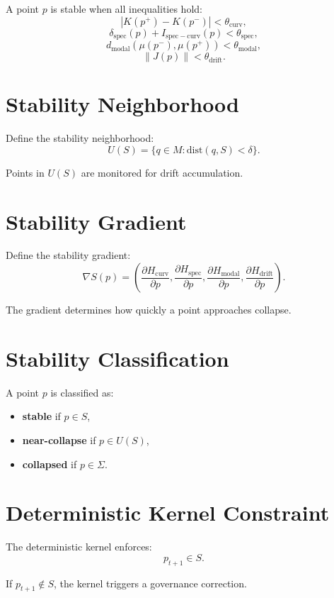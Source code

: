 \documentclass[11pt]{article}
\begin{document}
A point $p$ is stable when all inequalities hold:
\[
|K(p^+) - K(p^-)| < \theta_{\mathrm{curv}},
\]
\[
\delta_{\mathrm{spec}}(p)
  + I_{\mathrm{spec-curv}}(p)
  < \theta_{\mathrm{spec}},
\]
\[
d_{\mathrm{modal}}(\mu(p^-), \mu(p^+))
  < \theta_{\mathrm{modal}},
\]
\[
\|J(p)\| < \theta_{\mathrm{drift}}.
\]

\section{Stability Neighborhood}

Define the stability neighborhood:
\[
U(S)
  = \{ q \in M : \mathrm{dist}(q, S) < \delta \}.
\]

Points in $U(S)$ are monitored for drift accumulation.

\section{Stability Gradient}

Define the stability gradient:
\[
\nabla S(p)
  = \left(
      \frac{\partial H_{\mathrm{curv}}}{\partial p},
      \frac{\partial H_{\mathrm{spec}}}{\partial p},
      \frac{\partial H_{\mathrm{modal}}}{\partial p},
      \frac{\partial H_{\mathrm{drift}}}{\partial p}
    \right).
\]

The gradient determines how quickly a point approaches collapse.

\section{Stability Classification}

A point $p$ is classified as:
\begin{itemize}
  \item \textbf{stable} if $p \in S$,
  \item \textbf{near-collapse} if $p \in U(S)$,
  \item \textbf{collapsed} if $p \in \Sigma$.
\end{itemize}

\section{Deterministic Kernel Constraint}

The deterministic kernel enforces:
\[
p_{t+1} \in S.
\]

If $p_{t+1} \notin S$, the kernel triggers a governance correction.
\end{document}
